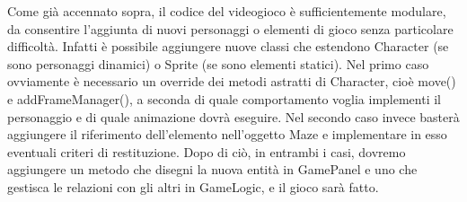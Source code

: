\documentclass[12pt,a4paper]{report}
\begin{document}
Come già accennato sopra, il codice del videogioco è sufficientemente modulare, da consentire l’aggiunta di nuovi personaggi o elementi di gioco senza particolare difficoltà. 
Infatti è possibile aggiungere nuove classi che estendono Character (se sono personaggi dinamici) o Sprite (se sono elementi statici). Nel primo caso ovviamente è necessario un override dei metodi astratti di Character, cioè move() e addFrameManager(), a seconda di quale comportamento voglia implementi il personaggio e di quale animazione dovrà eseguire.
Nel secondo caso invece basterà aggiungere il riferimento dell’elemento nell’oggetto Maze e implementare in esso eventuali criteri di restituzione. Dopo di ciò, in entrambi i casi, dovremo aggiungere un metodo che disegni la nuova entità in GamePanel e uno che gestisca le relazioni con gli altri in GameLogic, e il gioco sarà fatto.






\end{document}
